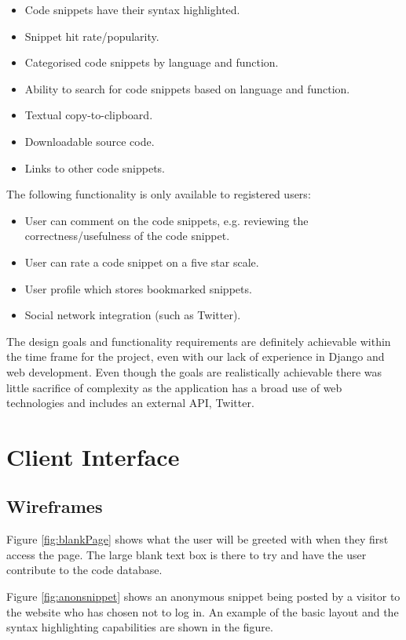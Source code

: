 \documentclass{sig-alt-release2}
\begin{document}
\begin{itemize}
\item Code snippets have their syntax highlighted.
\item Snippet hit rate/popularity.
\item Categorised code snippets by language and function.
\item Ability to search for code snippets based on language and
function.
\item Textual copy-to-clipboard.
\item Downloadable source code.
\item Links to other code snippets.
\end{itemize}

The following functionality is only available to registered users:
\label{sec:restrict}

\begin{itemize}
\item User can comment on the code snippets, e.g. reviewing the
correctness/usefulness of the code snippet.
\item User can rate a code snippet on a five star scale.
\item User profile which stores bookmarked snippets.
\item Social network integration (such as Twitter).
\end{itemize}

The design goals and functionality requirements are definitely achievable
within the time frame for the project, even with our lack of experience in
Django and web development. Even though the goals are realistically achievable
there was little sacrifice of complexity as the application has a broad use of
web technologies and includes an external API, Twitter.

\section{Client Interface}

\subsection{Wireframes}

Figure \ref{fig:blankPage} shows what the user will be greeted with when they
first access the page. The large blank text box is there to try and have the
user contribute to the code database.

Figure \ref{fig:anonsnippet} shows an anonymous snippet being posted by a
visitor to the website who has chosen not to log in. An example of the basic
layout and the syntax highlighting capabilities are shown in the figure.
\end{document}

